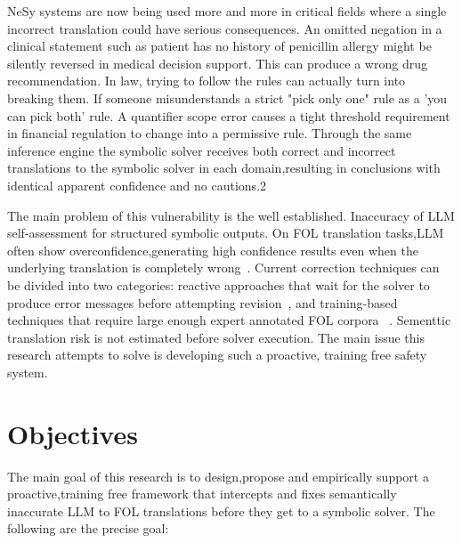 NeSy systems are now being used more and more in critical fields where a single incorrect translation could have serious consequences. An omitted negation in a clinical statement such as patient has no history of penicillin allergy might be silently reversed in medical decision support. This can produce a wrong drug recommendation. In law, trying to follow the rules can actually turn into breaking them. If someone misunderstands a strict "pick only one" rule as a 'you can pick both' rule. A quantifier scope error causes a tight threshold requirement in financial regulation to change into a permissive rule. Through the same inference engine the symbolic solver receives both correct and incorrect translations to the symbolic solver in each domain,resulting in conclusions with identical apparent confidence and no cautions.2

The main problem of this vulnerability is the well established. Inaccuracy of LLM self-assessment for structured symbolic outputs. On FOL translation tasks,LLM often show overconfidence,generating high confidence results even when the underlying translation is completely wrong~\cite{savage2024do, yang2024harnessing}. Current correction techniques can be divided into two categories: reactive approaches that wait for the solver to produce error messages before attempting revision~\cite{pan2023logiclm}, and training-based techniques that require large enough expert annotated FOL corpora ~\cite{thatikonda2024strategies}. Sementtic translation risk is not estimated before solver execution. The main issue this research attempts to solve is developing such a proactive, training free safety system.

\section{Objectives}

The main goal of this research is to design,propose and empirically support a proactive,training free framework that intercepts and fixes semantically inaccurate LLM to FOL translations before they get to a symbolic solver. The following are the precise goal:

